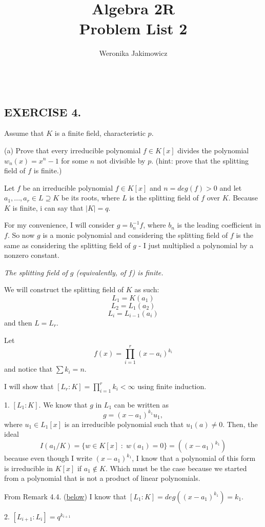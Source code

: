 \documentclass{article}
\title{\large Algebra 2R\smallskip\\ \textbf{Problem List 2}}
\author{\normalsize Weronika Jakimowicz}
\date{~~~}
\begin{document}
\maketitle\thispagestyle{empty}

\subsection*{EXERCISE 4.}
{\color{pink}Assume that $K$ is a finite field, characteristic $p$.

(a) Prove that every irreducible polynomial $f\in K[x]$ divides the polynomial $w_n(x)=x^n-1$ for some $n$ not divisible by $p$. (hint: prove that the splitting field of $f$ is finite.)}

Let $f$ be an irreducible polynomial $f\in K[x]$ and $n=deg(f)>0$ and let $a_1,...,a_r\in L\supseteq K$ be its roots, where $L$ is the splitting field of $f$ over $K$. Because $K$ is finite, i can say that $|K|=q$.

For my convenience, I will consider $g=b_n^{-1}f$, where $b_n$ is the leading coefficient in $f$. So now $g$ is a monic polynomial and considering the splitting field of $f$ is the same as considering the splitting field of $g$ - I just multiplied a polynomial by a nonzero constant.
\smallskip

\emph{ The splitting field of $g$ (equivalently, of $f$) is finite.}

We will construct the splitting field of $K$ as such:
$$L_1=K(a_1)$$
$$L_2=L_1(a_2)$$
$$L_i=L_{i-1}(a_i)$$
and then $L=L_r$.

Let
$$f(x)=\prod\limits_{i=1}^r(x-a_i)^{k_i}$$
and notice that $\sum k_i=n$.

I will show that $[L_r:K]=\prod\limits_{i=1}^rk_i<\infty$ using finite induction.

1. $[L_1:K]$. We know that $g$ in $L_1$ can be written as
$$g=(x-a_1)^{k_1}u_1,$$
where $u_1\in L_1[x]$ is an irreducible polynomial such that $u_1(a)\neq 0$. Then, the ideal
$$I(a_1/K)=\{w\in K[x]\;:\;w(a_1)=0\}=((x-a_1)^{k_1})$$
because even though I write $(x-a_1)^{k_1}$, I know that a polynomial of this form is irreducible in $K[x]$ if $a_1\notin K$. Which must be the case because we started from a polynomial that is not a product of linear polynomials.

From Remark 4.4. (\hyperref[remark:4:4]{below}) I know that $[L_1:K]=deg((x-a_1)^{k_1})=k_1$.
\smallskip

2. $[L_{i+1}:L_i]=q^{k_{i+1}}$
\end{document}
